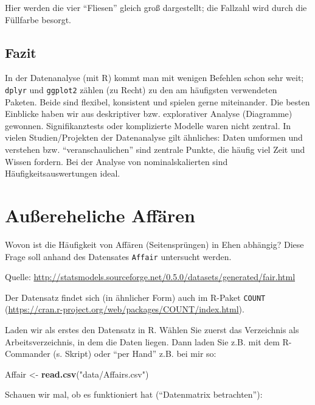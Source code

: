 \documentclass[12pt,ngerman,]{book}
\makeatletter
\newenvironment{Shaded}{\begin{snugshade}}{\end{snugshade}}
\newcommand{\KeywordTok}[1]{\textcolor[rgb]{0.13,0.29,0.53}{\textbf{{#1}}}}
\newcommand{\StringTok}[1]{\textcolor[rgb]{0.31,0.60,0.02}{{#1}}}
\newcommand{\NormalTok}[1]{{#1}}
\newenvironment{kframe}{%
\medskip{}
\setlength{\fboxsep}{.8em}
 \def\at@end@of@kframe{}%
 \ifinner\ifhmode%
  \def\at@end@of@kframe{\end{minipage}}%
  \begin{minipage}{\columnwidth}%
 \fi\fi%
 \def\FrameCommand##1{\hskip\@totalleftmargin \hskip-\fboxsep
 \colorbox{shadecolor}{##1}\hskip-\fboxsep
     \hskip-\linewidth \hskip-\@totalleftmargin \hskip\columnwidth}%
 \MakeFramed {\advance\hsize-\width
   \@totalleftmargin\z@ \linewidth\hsize
   \@setminipage}}%
 {\par\unskip\endMakeFramed%
 \at@end@of@kframe}
\renewenvironment{Shaded}{\begin{kframe}}{\end{kframe}}
\theoremstyle{definition}
\theoremstyle{definition}
\theoremstyle{remark}
\makeatother
\begin{document}
Hier werden die vier ``Fliesen'' gleich groß dargestellt; die Fallzahl
wird durch die Füllfarbe besorgt.

\subsection{Fazit}\label{fazit-1}

In der Datenanalyse (mit R) kommt man mit wenigen Befehlen schon sehr
weit; \texttt{dplyr} und \texttt{ggplot2} zählen (zu Recht) zu den am
häufigsten verwendeten Paketen. Beide sind flexibel, konsistent und
spielen gerne miteinander. Die besten Einblicke haben wir aus
deskriptiver bzw. explorativer Analyse (Diagramme) gewonnen.
Signifikanztests oder komplizierte Modelle waren nicht zentral. In
vielen Studien/Projekten der Datenanalyse gilt ähnliches: Daten umformen
und verstehen bzw. ``veranschaulichen'' sind zentrale Punkte, die häufig
viel Zeit und Wissen fordern. Bei der Analyse von nominalskalierten sind
Häufigkeitsauswertungen ideal.

\section{Außereheliche Affären}\label{auereheliche-affaren}

Wovon ist die Häufigkeit von Affären (Seitensprüngen) in Ehen abhängig?
Diese Frage soll anhand des Datensates \texttt{Affair} untersucht
werden.

Quelle:
\url{http://statsmodels.sourceforge.net/0.5.0/datasets/generated/fair.html}

Der Datensatz findet sich (in ähnlicher Form) auch im R-Paket
\texttt{COUNT}
(\url{https://cran.r-project.org/web/packages/COUNT/index.html}).

Laden wir als erstes den Datensatz in R. Wählen Sie zuerst das
Verzeichnis als Arbeitsverzeichnis, in dem die Daten liegen. Dann laden
Sie z.B. mit dem R-Commander (s. Skript) oder ``per Hand'' z.B. bei mir
so:

\begin{Shaded}
\begin{Highlighting}[]
\NormalTok{Affair <-}\StringTok{ }\KeywordTok{read.csv}\NormalTok{(}\StringTok{"data/Affairs.csv"}\NormalTok{)}
\end{Highlighting}
\end{Shaded}

Schauen wir mal, ob es funktioniert hat (``Datenmatrix betrachten''):
\end{document}
